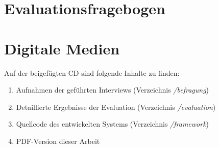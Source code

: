 \chapter{Evaluationsfragebogen} \label{appendix:evaluation}


\chapter{Digitale Medien}

Auf der beigefügten CD sind folgende Inhalte zu finden:
\begin{enumerate}[noitemsep,topsep=0pt]
    \item Aufnahmen der geführten Interviews (Verzeichnis \textit{/befragung})
    \item Detaillierte Ergebnisse der Evaluation (Verzeichnis \textit{/evaluation})
    \item Quellcode des entwickelten Systems (Verzeichnis \textit{/framework})
    \item PDF-Version dieser Arbeit
\end{enumerate}

